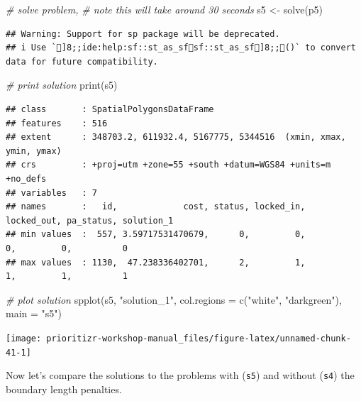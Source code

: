\documentclass[
  12pt,
]{book}
\newenvironment{Shaded}{\begin{snugshade}}{\end{snugshade}}
\newcommand{\AttributeTok}[1]{\textcolor[rgb]{0.77,0.63,0.00}{#1}}
\newcommand{\CommentTok}[1]{\textcolor[rgb]{0.56,0.35,0.01}{\textit{#1}}}
\newcommand{\FunctionTok}[1]{\textcolor[rgb]{0.00,0.00,0.00}{#1}}
\newcommand{\NormalTok}[1]{#1}
\newcommand{\OtherTok}[1]{\textcolor[rgb]{0.56,0.35,0.01}{#1}}
\newcommand{\StringTok}[1]{\textcolor[rgb]{0.31,0.60,0.02}{#1}}
\begin{document}
\begin{Shaded}
\begin{Highlighting}[]
\CommentTok{\# solve problem,}
\CommentTok{\# note this will take around 30 seconds}
\NormalTok{s5 }\OtherTok{\textless{}{-}} \FunctionTok{solve}\NormalTok{(p5)}
\end{Highlighting}
\end{Shaded}

\begin{verbatim}
## Warning: Support for sp package will be deprecated.
## i Use `]8;;ide:help:sf::st_as_sfsf::st_as_sf]8;;()` to convert data for future compatibility.
\end{verbatim}

\begin{Shaded}
\begin{Highlighting}[]
\CommentTok{\# print solution}
\FunctionTok{print}\NormalTok{(s5)}
\end{Highlighting}
\end{Shaded}

\begin{verbatim}
## class       : SpatialPolygonsDataFrame 
## features    : 516 
## extent      : 348703.2, 611932.4, 5167775, 5344516  (xmin, xmax, ymin, ymax)
## crs         : +proj=utm +zone=55 +south +datum=WGS84 +units=m +no_defs 
## variables   : 7
## names       :   id,             cost, status, locked_in, locked_out, pa_status, solution_1 
## min values  :  557, 3.59717531470679,      0,         0,          0,         0,          0 
## max values  : 1130,  47.238336402701,      2,         1,          1,         1,          1
\end{verbatim}

\begin{Shaded}
\begin{Highlighting}[]
\CommentTok{\# plot solution}
\FunctionTok{spplot}\NormalTok{(s5, }\StringTok{"solution\_1"}\NormalTok{, }\AttributeTok{col.regions =} \FunctionTok{c}\NormalTok{(}\StringTok{"white"}\NormalTok{, }\StringTok{"darkgreen"}\NormalTok{), }\AttributeTok{main =} \StringTok{"s5"}\NormalTok{)}
\end{Highlighting}
\end{Shaded}

\begin{center}\texttt{[image: prioritizr-workshop-manual\_files/figure-latex/unnamed-chunk-41-1]} \end{center}

Now let's compare the solutions to the problems with (\texttt{s5}) and without (\texttt{s4}) the boundary length penalties.
\end{document}
